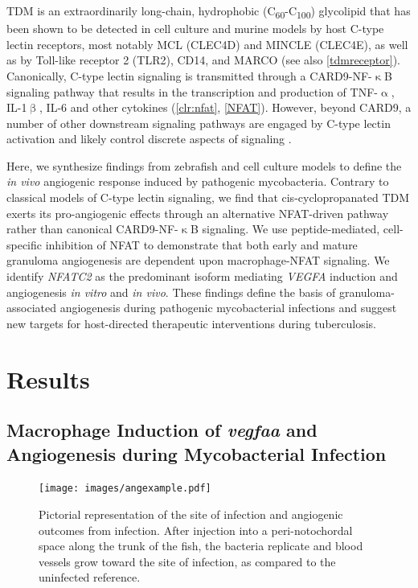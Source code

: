 TDM is an extraordinarily long\hyp{}chain, hydrophobic (C\textsubscript{60}\hyp{}C\textsubscript{100}) glycolipid \citep{Noll1956a, Noll1956b, Hunter2006a, Behling1993} that has been shown to be detected in cell culture and murine models by host C\hyp{}type lectin receptors, most notably MCL (CLEC4D) and MINCLE (CLEC4E), as well as by Toll\hyp{}like receptor 2 (TLR2), CD14, and MARCO \citep{Bowdish2009, Matsunaga2009, Miyake2013, Ishikawa2009} (see also \autoref{tdmreceptor}). Canonically, C\hyp{}type lectin signaling is transmitted through a CARD9\hyp{}NF\hyp{}$\upkappa$B signaling pathway that results in the transcription and production of TNF\hyp{}$\upalpha$, IL\hyp{}1$\upbeta$, IL\hyp{}6 and other cytokines \citep{Yamasaki2008, Goodridge2009, LobatoPascual2013, Zhao2014, Deerhake2021} (\autoref{clr:nfat}, \autoref{NFAT}). However, beyond CARD9, a number of other downstream signaling pathways are engaged by C\hyp{}type lectin activation and likely control discrete aspects of signaling \citep{Goodridge2007, Deerhake2021}.

Here, we synthesize findings from zebrafish and cell culture models to define the \textit{in vivo} angiogenic response induced by pathogenic mycobacteria. Contrary to classical models of C\hyp{}type lectin signaling, we find that cis\hyp{}cyclopropanated TDM exerts its pro\hyp{}angiogenic effects through an alternative NFAT\hyp{}driven pathway rather than canonical CARD9\hyp{}NF\hyp{}$\upkappa$B signaling. We use peptide\hyp{}mediated, cell\hyp{}specific inhibition of NFAT to demonstrate that both early and mature granuloma angiogenesis are dependent upon macrophage\hyp{}NFAT signaling. We identify \textit{NFATC2} as the predominant isoform mediating \textit{VEGFA} induction and angiogenesis \textit{in vitro} and \textit{in vivo}. These findings define the basis of granuloma\hyp{}associated angiogenesis during pathogenic mycobacterial infections and suggest new targets for host\hyp{}directed therapeutic interventions during tuberculosis.

\section{Results}

\subsection{Macrophage Induction of \textit{vegfaa} and Angiogenesis during Mycobacterial Infection}

\begin{figure}
\centering
\texttt{[image: images/angexample.pdf]}
\caption{Pictorial representation of the site of infection and angiogenic outcomes from infection. After injection into a peri\hyp{}notochordal space along the trunk of the fish, the bacteria replicate and blood vessels grow toward the site of infection, as compared to the uninfected reference.}
\label{figure:angexample}

\end{figure}

